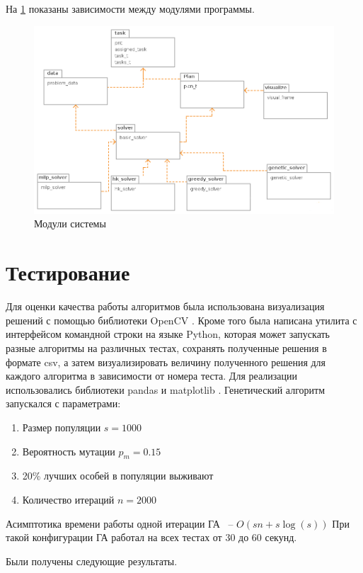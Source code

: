 \documentclass[a4paper,14pt,russian]{article}
\begin{document}
На \cref{fig:modules} показаны зависимости между модулями программы.
\begin{figure}[here]
\includegraphics[scale=0.5]{images/group-control.png}
\caption{Модули системы}
\label{fig:modules}
\end{figure}

\section{Тестирование}
Для оценки качества работы алгоритмов была использована визуализация решений с помощью библиотеки OpenCV \cite{bradski2008learning}.
Кроме того была написана утилита с интерфейсом командной строки на языке Python, которая может запускать разные алгоритмы на различных тестах, сохранять полученные решения в формате csv, а затем визуализировать величину полученного решения для каждого алгоритма в зависимости от номера теста.
Для реализации использовались библиотеки pandas \cite{mckinney2010data} и matplotlib \cite{hunter2007matplotlib}. Генетический алгоритм запускался с параметрами:
\begin{enumerate}
\item Размер популяции $s = 1000$
\item Вероятность мутации $p_m = 0.15$
\item 20\% лучших особей в популяции выживают
\item Количество итераций $n = 2000$
\end{enumerate}

Асимптотика времени работы одной итерации ГА ~-- $O(s n + s\log(s))$
При такой конфигурации ГА работал на всех тестах от 30 до 60 секунд.

Были получены следующие результаты.
\end{document}
